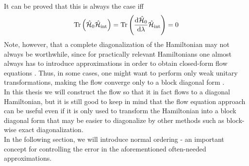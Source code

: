 It can be proved \cite[pp. 27-28]{kehrein2006flow} that this is always the case iff 
\begin{align}\label{useless_check}
\mathrm{Tr}\left(\hat{\mathcal{H}}_0\hat{\mathcal{H}}_{\mathrm{int}}\right)=\mathrm{Tr}\left(\frac{\mathrm d\hat{\mathcal{H}}_0}{\mathrm d\lambda} \hat{\mathcal{H}}_{\mathrm{int}}\right)=0
\end{align}
Note, however, that a complete diagonalization of the Hamiltonian may not always be worthwhile, since for practically relevant Hamiltonians one almost always has to introduce approximations in order to obtain closed-form flow equations \cite{Wegner_2006}. Thus, in some cases, one might want to perform only weak unitary transformations, making the flow converge only to a block diagonal form \cite{Wegner_2006}. \\
In this thesis we will construct the flow so that it in fact flows to a diagonal Hamiltonian, but it is still good to keep in mind that the flow equation approach can be useful even if it is only used to transform the Hamiltonian into a block diagonal form that may be easier to diagonalize by other methods such as block-wise exact diagonalization.\\ 
In the following section, we will introduce normal ordering - an important concept for controlling the error in the aforementioned often-needed approximations.
